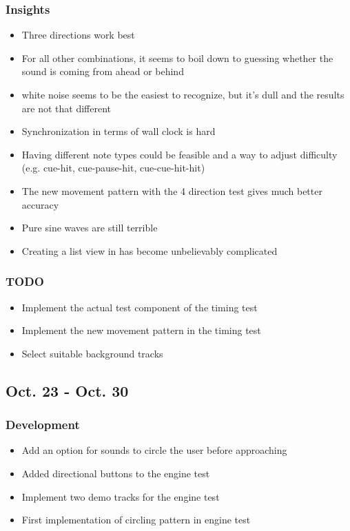 \documentclass{article}
\begin{document}
\subsubsection{Insights}
\begin{itemize}
    \item Three directions work best
    \item For all other combinations, it seems to boil down to guessing whether the sound is coming from ahead or behind
    \item white noise seems to be the easiest to recognize, but it's dull and the results are not that different
    \item Synchronization in terms of wall clock is hard
    \item Having different note types could be feasible and a way to adjust difficulty (e.g. cue-hit, cue-pause-hit, cue-cue-hit-hit)
    \item The new movement pattern with the 4 direction test gives much better accuracy
    \item Pure sine waves are still terrible
    \item Creating a list view in has become unbelievably complicated
\end{itemize}
\subsubsection{TODO}
\begin{itemize}
    \item Implement the actual test component of the timing test
    \item Implement the new movement pattern in the timing test
    \item Select suitable background tracks
\end{itemize}
\subsection{Oct. 23 - Oct. 30}
\subsubsection{Development}
\begin{itemize}
    \item Add an option for sounds to circle the user before approaching
    \item Added directional buttons to the engine test
    \item Implement two demo tracks for the engine test
    \item First implementation of circling pattern in engine test
\end{itemize}
\end{document}
